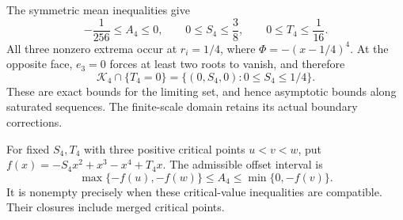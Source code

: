 The symmetric mean inequalities give
\[
 -\frac1{256}\le A_4\le0,\qquad
 0\le S_4\le\frac38,\qquad 0\le T_4\le\frac1{16}.
\]
All three nonzero extrema occur at $r_i=1/4$, where
$\Phi=-(x-1/4)^4$. At the opposite face, $e_3=0$ forces at least two
roots to vanish, and therefore
\[
 \mathcal K_4\cap\{T_4=0\}
 =\{(0,S_4,0):0\le S_4\le1/4\}.
\]
These are exact bounds for the limiting set, and hence asymptotic bounds
along saturated sequences. The finite-scale domain retains its actual
boundary corrections.

For fixed $S_4,T_4$ with three positive critical points $u<v<w$, put
$f(x)=-S_4x^2+x^3-x^4+T_4x$. The admissible offset interval is
\[
 \max\{-f(u),-f(w)\}\le A_4\le\min\{0,-f(v)\}.
\]
It is nonempty precisely when these critical-value inequalities are
compatible. Their closures include merged critical points.
